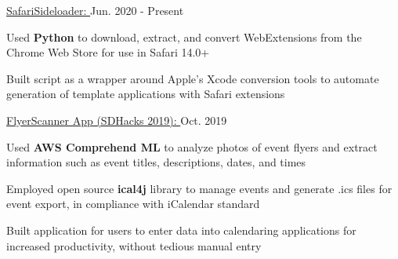
\begin{cventries}

  \cvproject
    {\href{https://github.com/hexalellogram/SafariSideloader}{SafariSideloader: }} %
    {Jun. 2020 - Present} %
    {
      \begin{cvitems} %
        \item {Used \textbf{Python} to download, extract, and convert WebExtensions from the Chrome Web Store for use in Safari 14.0+}
        \item {Built script as a wrapper around Apple's Xcode conversion tools to automate generation of template applications with Safari extensions}
      \end{cvitems}
    }

  \cvproject
    {\href{https://github.com/hexalellogram/FlyerScanner}{FlyerScanner App (SDHacks 2019): }} %
    {Oct. 2019} %
    {
      \begin{cvitems} %
        \item {Used \textbf{AWS Comprehend ML} to analyze photos of event flyers and extract information such as event titles, descriptions, dates, and times}
        \item {Employed open source \textbf{ical4j} library to manage events and generate .ics files for event export, in compliance with iCalendar standard}
        \item {Built application for users to enter data into calendaring applications for increased productivity, without tedious manual entry}
      \end{cvitems}
    }


\end{cventries}

